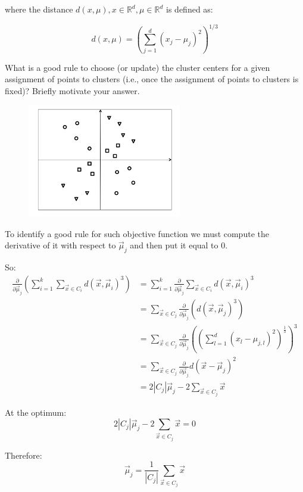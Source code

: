 \documentclass[a4paper,11pt,oneside]{book}
\begin{document}
\begin{enumerate}
        where the distance $d(x,\mu), x \in \mathbb{R}^d, \mu \in \mathbb{R}^d$ is defined as:

        $$d(x,\mu) = \left(\sum_{j=1}^d (x_j - \mu_j)^2\right)^{1/3}$$

        What is a good rule to choose (or update) the cluster centers for a given assignment of points to clusters (i.e., once the assignment of points to clusters is fixed)? Briefly motivate your answer.

        \begin{figure}[H]
        \centering
        \includegraphics[width=0.6\textwidth,height=0.4\textheight,keepaspectratio]{images/2_1_July_2019.png}
        \end{figure}

        \begin{solution}
            To identify a good rule for such objective function we must compute the derivative of it with respect to $\vec{\mu}_j$ and then put it equal to 0.
            
            So:
            \begin{align*}
            \frac{\partial}{\partial\vec{\mu}_j}\left(\sum_{i=1}^k \sum_{\vec{x}\in C_i} d(\vec{x},\vec{\mu}_i)^3\right) &= \sum_{i=1}^k \frac{\partial}{\partial\vec{\mu}_j}\sum_{\vec{x}\in C_i} d(\vec{x},\vec{\mu}_i)^3 \\
            &= \sum_{\vec{x}\in C_j} \frac{\partial}{\partial\vec{\mu}_j}(d(\vec{x},\vec{\mu}_j)^3) \\
            &= \sum_{\vec{x}\in C_j} \frac{\partial}{\partial\vec{\mu}_j}\left((\sum_{l=1}^d (x_l - \mu_{j,l})^2)^\frac{1}{3}\right)^3 \\
            &= \sum_{\vec{x}\in C_j} \frac{\partial}{\partial\vec{\mu}_j}d(\vec{x} - \vec{\mu}_j)^2 \\ 
            &= 2|C_j|\vec{\mu}_j - 2\sum_{\vec{x}\in C_j} \vec{x}
            \end{align*}
            
            At the optimum:
            $$2|C_j|\vec{\mu}_j - 2\sum_{\vec{x}\in C_j} \vec{x} = 0$$
            
            Therefore:
            $$\vec{\mu}_j = \frac{1}{|C_j|}\sum_{\vec{x}\in C_j} \vec{x}$$
        \end{solution}
    \end{enumerate}
\end{document}
